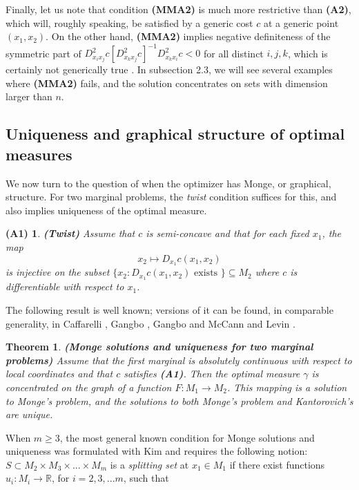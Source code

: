 \documentclass[letter,10pt]{article}
\theoremstyle{dotless}
\begin{document}
Finally, let us note that condition \textbf{(MMA2)} is much more restrictive than \textbf{(A2)}, which will, roughly speaking, be satisfied by a generic cost $c$ at a generic point $(x_1,x_2)$.    On the other hand, \textbf{(MMA2)} implies negative definiteness of the symmetric part of $D^2_{x_ix_j}c[D^2_{x_kx_j}c]^{-1}D^2_{x_kx_i}c<0$ for all distinct $i,j,k$, which is certainly not generically true \cite{P4}.  In subsection 2.3, we will see several examples where \textbf{(MMA2)} fails, and the solution concentrates on sets with dimension larger than $n$.
\subsection{Uniqueness and graphical structure of optimal measures}
We now turn to the question of when the optimizer has  Monge, or graphical, structure.   For two marginal problems, the \textit{twist} condition suffices for this, and also implies uniqueness of the optimal measure.
\newtheorem*{twist}{(A1)}
\begin{twist}
\textbf{(Twist)} Assume that $c$ is semi-concave and that for each fixed $x_1$, the map
\begin{equation*}
x_2 \mapsto D_{x_1}c(x_1,x_2)
\end{equation*}
is injective on the subset $\{x_2: D_{x_1}c(x_1,x_2) \text{ exists }\} \subseteq M_2$ where $c$ is differentiable with respect to $x_1$.
\end{twist}

The following result is well known; versions of it can be found, in comparable generality, in Caffarelli \cite{Caf}, Gangbo \cite{G}, Gangbo and McCann \cite{GM} and Levin \cite{lev}.
\newtheorem{mapping}{Theorem}[subsection]
\begin{mapping}\label{mapping}
\textbf{(Monge solutions and uniqueness for two marginal problems)} Assume that the first marginal is absolutely continuous with respect to local coordinates and that $c$ satisfies \textbf{(A1)}.  Then the optimal measure $\gamma$ is concentrated on the graph of a function $F: M_1 \rightarrow M_2$.  This mapping is a solution to Monge's problem, and the solutions to both Monge's problem and Kantorovich's are unique.
\end{mapping}

When $m \geq 3$, the most general known condition for Monge solutions and uniqueness was formulated with Kim \cite{KP2} and requires  the following notion:
$S \subset M_2 \times M_3 \times ...\times M_m$ is a \textit{splitting set} at $x_1 \in M_1$ if there exist functions $u_i :M_i \rightarrow \mathbb{R}$, for $i=2,3,...m$, such that
\end{document}

